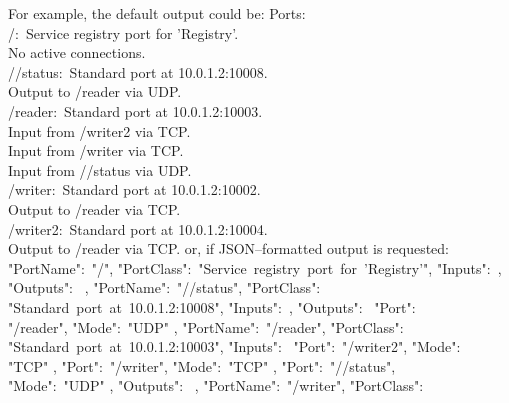 For example, the default output could be:
\outputBegin{}
Ports:\\
\settowidth{\uL}{Por}%
/\dollarService:\ Service registry port for 'Registry'.\\
\hspace*{\uL}No active connections.\\
/\dollarService/status:\ Standard port at 10.0.1.2:10008.\\
\hspace*{\uL}Output to /reader via UDP.\\
/reader:\ Standard port at 10.0.1.2:10003.\\
\hspace*{\uL}Input from /writer2 via TCP.\\
\hspace*{\uL}Input from /writer via TCP.\\
\hspace*{\uL}Input from /\dollarService/status via UDP.\\
/writer:\ Standard port at 10.0.1.2:10002.\\
\hspace*{\uL}Output to /reader via TCP.\\
/writer2:\ Standard port at 10.0.1.2:10004.\\
\hspace*{\uL}Output to /reader via TCP.
\outputEnd{}
or, if JSON--formatted output is requested:
\outputBegin{}
\openSq{} \textbraceleft{} "PortName":\ "/\dollarService", "PortClass":\
"Service~registry~port~for~'Registry'", "Inputs":\ \sqPair, "Outputs":\
\sqPair{} \textbraceright{}, \textbraceleft{} "PortName":\ "/\dollarService/status",
"PortClass":\ \\
"Standard~port~at~10.0.1.2:10008", "Inputs":\ \sqPair, "Outputs":\ \openSq{}
\textbraceleft{} "Port":\ \\
"/reader", "Mode":\ "UDP" \textbraceright{} \closeSq{} \textbraceright{},
\textbraceleft{} "PortName":\ "/reader", "PortClass":\ \\
"Standard~port~at~10.0.1.2:10003", "Inputs":\ \openSq{} \textbraceleft{} "Port":\
"/writer2", "Mode":\ \\
"TCP" \textbraceright{}, \textbraceleft{} "Port":\ "/writer", "Mode":\ "TCP"
\textbraceright, \textbraceleft{} "Port":\ "/\dollarService/status",\\
"Mode":\ "UDP" \textbraceright{} \closeSq, "Outputs":\ \sqPair{} \textbraceright,
\textbraceleft{} "PortName":\ "/writer", "PortClass":\ \\

